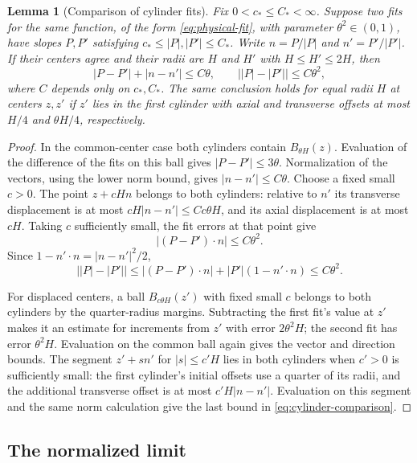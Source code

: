 \documentclass[11pt]{article}
\numberwithin{equation}{section}
\newtheorem{lemma}[theorem]{Lemma}
\theoremstyle{definition}
\theoremstyle{remark}
\begin{document}
\begin{lemma}[Comparison of cylinder fits]\label{lem:cylinder-comparison}
Fix $0<c_*\le C_*<\infty$. Suppose two fits for the same function, of the form \eqref{eq:physical-fit}, with parameter $\theta^2\in(0,1)$, have slopes $P,P'$ satisfying $c_*\le |P|,|P'|\le C_*$. Write $n=P/|P|$ and $n'=P'/|P'|$. If their centers agree and their radii are $H$ and $H'$ with $H\le H'\le2H$, then
\begin{equation}\label{eq:cylinder-comparison}
  |P-P'|+|n-n'|\le C\theta,\qquad
  \bigl||P|-|P'|\bigr|\le C\theta^2,
\end{equation}
where $C$ depends only on $c_*,C_*$. The same conclusion holds for equal radii $H$ at centers $z,z'$ if $z'$ lies in the first cylinder with axial and transverse offsets at most $H/4$ and $\theta H/4$, respectively.
\end{lemma}

\begin{proof}
In the common-center case both cylinders contain $B_{\theta H}(z)$. Evaluation of the difference of the fits on this ball gives $|P-P'|\le3\theta$. Normalization of the vectors, using the lower norm bound, gives $|n-n'|\le C\theta$. Choose a fixed small $c>0$. The point $z+cHn$ belongs to both cylinders: relative to $n'$ its transverse displacement is at most $cH|n-n'|\le Cc\theta H$, and its axial displacement is at most $cH$. Taking $c$ sufficiently small, the fit errors at that point give
\[
  |(P-P')\cdot n|\le C\theta^2.
\]
Since $1-n'\cdot n=|n-n'|^2/2$,
\[
  \bigl||P|-|P'|\bigr|
   \le |(P-P')\cdot n|+|P'|(1-n'\cdot n)\le C\theta^2.
\]

For displaced centers, a ball $B_{c\theta H}(z')$ with fixed small $c$ belongs to both cylinders by the quarter-radius margins. Subtracting the first fit's value at $z'$ makes it an estimate for increments from $z'$ with error $2\theta^2H$; the second fit has error $\theta^2H$. Evaluation on the common ball again gives the vector and direction bounds. The segment $z'+s n'$ for $|s|\le c'H$ lies in both cylinders when $c'>0$ is sufficiently small: the first cylinder's initial offsets use a quarter of its radii, and the additional transverse offset is at most $c'H|n-n'|$. Evaluation on this segment and the same norm calculation give the last bound in \eqref{eq:cylinder-comparison}.
\end{proof}

\subsection{The normalized limit}
\end{document}
